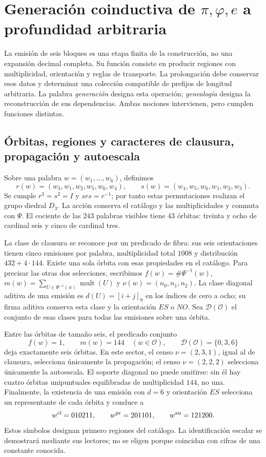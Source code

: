 \section{Generación coinductiva de \texorpdfstring{\(\pi,\varphi,e\)}{pi, phi, e} a profundidad arbitraria}
\label{sec:generacion}

La emisión de seis bloques es una etapa finita de la construcción, no una expansión decimal completa. Su función consiste en producir regiones con multiplicidad, orientación y reglas de transporte. La prolongación debe conservar esos datos y determinar una colección compatible de prefijos de longitud arbitraria. La palabra \emph{generación} designa esta operación; \emph{genealogía} designa la reconstrucción de sus dependencias. Ambas nociones intervienen, pero cumplen funciones distintas.

\subsection{Órbitas, regiones y caracteres de clausura, propagación y autoescala}

Sobre una palabra \(w=(w_1,\ldots,w_6)\), definimos
\[
 r(w)=(w_3,w_1,w_2,w_5,w_6,w_4),\qquad
 s(w)=(w_4,w_5,w_6,w_1,w_2,w_3).
\]
Se cumple \(r^3=s^2=I\) y \(srs=r^{-1}\); por tanto estas permutaciones realizan el grupo diedral \(D_3\). La acción conserva el catálogo y las multiplicidades y conmuta con \(\Psi\). El cociente de las \(243\) palabras visibles tiene \(43\) órbitas: treinta y ocho de cardinal seis y cinco de cardinal tres.

La clase de clausura se reconoce por un predicado de fibra: sus seis orientaciones tienen cinco emisiones por palabra, multiplicidad total \(1008\) y distribución \(432+4\cdot144\). Existe una sola órbita con esas propiedades en el catálogo. Para precisar las otras dos selecciones, escribimos \(f(w)=\#\Psi^{-1}(w)\), \(m(w)=\sum_{U\in\Psi^{-1}(w)}\operatorname{mult}(U)\) y \(\nu(w)=(n_0,n_1,n_2)\). La clase diagonal aditiva de una emisión es \(d(U)=[i+j]_9\) en los índices de cero a ocho; su firma aditiva conserva esta clase y la orientación \(ES\) o \(NO\). Sea \(\mathcal D(\mathcal O)\) el conjunto de esas clases para todas las emisiones sobre una órbita.

Entre las órbitas de tamaño seis, el predicado conjunto
\[
 f(w)=1,\qquad m(w)=144\quad(w\in\mathcal O),\qquad
 \mathcal D(\mathcal O)=\{0,3,6\}
\]
deja exactamente seis órbitas. En este sector, el censo \(\nu=(2,3,1)\), igual al de clausura, selecciona únicamente la propagación; el censo \(\nu=(2,2,2)\) selecciona únicamente la autoescala. El soporte diagonal no puede omitirse: sin él hay cuatro órbitas unipuntuales equilibradas de multiplicidad \(144\), no una. Finalmente, la existencia de una emisión con \(d=6\) y orientación \(ES\) selecciona un representante de cada órbita y conduce a
\begin{equation}
 w^{\rm cl}=010211,\qquad w^{\rm pr}=201101,\qquad w^{\rm au}=121200.
 \label{eq:palabras-regionales}
\end{equation}
Estos símbolos designan primero regiones del catálogo. La identificación escalar se demostrará mediante sus lectores; no se eligen porque coincidan con cifras de una constante conocida.

